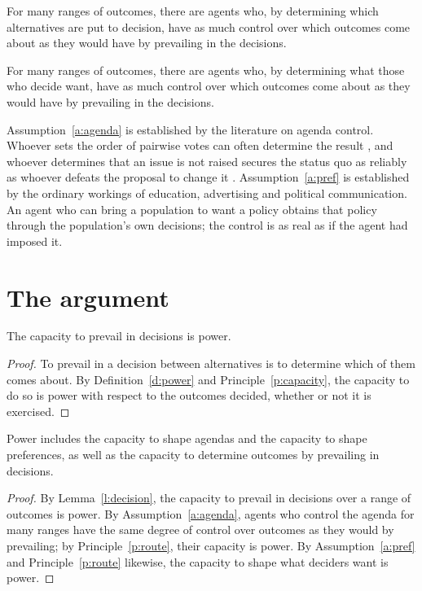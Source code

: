 \documentclass{situationist-preprint}
\begin{document}
\begin{assumption}\label{a:agenda}
For many ranges of outcomes, there are agents who, by determining which alternatives are put to decision, have as much control over which outcomes come about as they would have by prevailing in the decisions.
\end{assumption}

\begin{assumption}\label{a:pref}
For many ranges of outcomes, there are agents who, by determining what those who decide want, have as much control over which outcomes come about as they would have by prevailing in the decisions.
\end{assumption}

Assumption~\ref{a:agenda} is established by the literature on agenda control. Whoever sets the order of pairwise votes can often determine the result \citep{Riker1982}, and whoever determines that an issue is not raised secures the status quo as reliably as whoever defeats the proposal to change it \citep{Crenson1971}. Assumption~\ref{a:pref} is established by the ordinary workings of education, advertising and political communication. An agent who can bring a population to want a policy obtains that policy through the population's own decisions; the control is as real as if the agent had imposed it.

\section{The argument}

\begin{lemma}\label{l:decision}
The capacity to prevail in decisions is power.
\end{lemma}

\begin{proof}
To prevail in a decision between alternatives is to determine which of them comes about. By Definition~\ref{d:power} and Principle~\ref{p:capacity}, the capacity to do so is power with respect to the outcomes decided, whether or not it is exercised.
\end{proof}

\begin{theorem}\label{t:main}
Power includes the capacity to shape agendas and the capacity to shape preferences, as well as the capacity to determine outcomes by prevailing in decisions.
\end{theorem}

\begin{proof}
By Lemma~\ref{l:decision}, the capacity to prevail in decisions over a range of outcomes is power. By Assumption~\ref{a:agenda}, agents who control the agenda for many ranges have the same degree of control over outcomes as they would by prevailing; by Principle~\ref{p:route}, their capacity is power. By Assumption~\ref{a:pref} and Principle~\ref{p:route} likewise, the capacity to shape what deciders want is power.
\end{proof}
\end{document}
